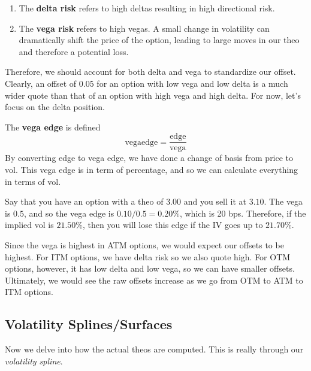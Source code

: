 \documentclass{article}
\begin{document}
    \begin{enumerate}
      \item The \textbf{delta risk} refers to high deltas resulting in high directional risk.
      \item The \textbf{vega risk} refers to high vegas. A small change in volatility can dramatically shift the price of the option, leading to large moves in our theo and therefore a potential loss.
    \end{enumerate}

     Therefore, we should account for both delta and vega to standardize our offset. Clearly, an offset of $0.05$ for an option with low vega and low delta is a much wider quote than that of an option with high vega and high delta. For now, let's focus on the delta position.

    \begin{definition}
      The \textbf{vega edge} is defined
      \begin{equation}
        \mathrm{vega edge} = \frac{\text{edge}}{\text{vega}}
      \end{equation}
      By converting edge to vega edge, we have done a change of basis from price to vol. This vega edge is in term of percentage, and so we can calculate everything in terms of vol.
    \end{definition}

    \begin{example}
      Say that you have an option with a theo of $3.00$ and you sell it at $3.10$. The vega is $0.5$, and so the vega edge is $0.10 / 0.5 = 0.20\%$, which is 20 bps. Therefore, if the implied vol is $21.50\%$, then you will lose this edge if the IV goes up to $21.70\%$.
    \end{example}

     Since the vega is highest in ATM options, we would expect our offsets to be highest. For ITM options, we have delta risk so we also quote high. For OTM options, however, it has low delta and low vega, so we can have smaller offsets. Ultimately, we would see the raw offsets increase as we go from OTM to ATM to ITM options.

  \subsection{Volatility Splines/Surfaces}

    Now we delve into how the actual theos are computed. This is really through our \textit{volatility spline}. 
\end{document}
